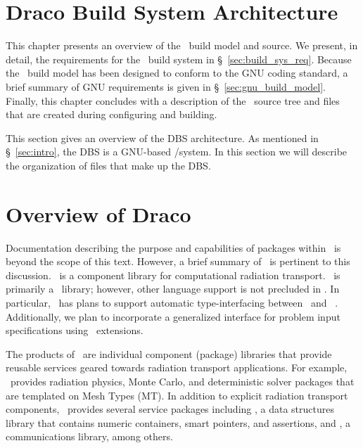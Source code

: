 
\section{Draco Build System Architecture}
\label{chap:model}

This chapter presents an overview of the \draco\ build model and
source.  We present, in detail, the requirements for the \draco\ build
system in \S~\ref{sec:build_sys_req}.  Because the \draco\ build model
has been designed to conform to the GNU coding standard, a brief
summary of GNU requirements is given in \S~\ref{sec:gnu_build_model}.
Finally, this chapter concludes with a description of the \draco\ 
source tree and files that are created during configuring and
building.

This section gives an overview of the DBS architecture.  As mentioned
in \S~\ref{sec:intro}, the DBS is a GNU-based \autoconf/\make system.
In this section we will describe the organization of files that make
up the DBS.


\section{Overview of Draco}
\label{sec:overview_of_draco}

Documentation describing the purpose and capabilities of packages
within \draco\ is beyond the scope of this text.  However, a brief
summary of \draco\ is pertinent to this discussion.  \draco\ is a
component library for computational radiation transport.  \draco\ is
primarily a \cpp\ library; however, other language support is not
precluded in \draco.  In particular, \draco\ has plans to support
automatic type-interfacing between \cpp\ and \fortran~\cite{gr99}.
Additionally, we plan to incorporate a generalized interface for
problem input specifications using \python\ extensions.

The products of \draco\ are individual component (package) libraries
that provide reusable services geared towards radiation transport
applications.  For example, \draco\ provides radiation physics, Monte
Carlo, and deterministic solver packages that are templated on Mesh
Types (MT).  In addition to explicit radiation transport components,
\draco\ provides several service packages including \dsxx, a data
structures library that contains numeric containers, smart pointers,
and assertions, and \cfour, a communications library, among others.

